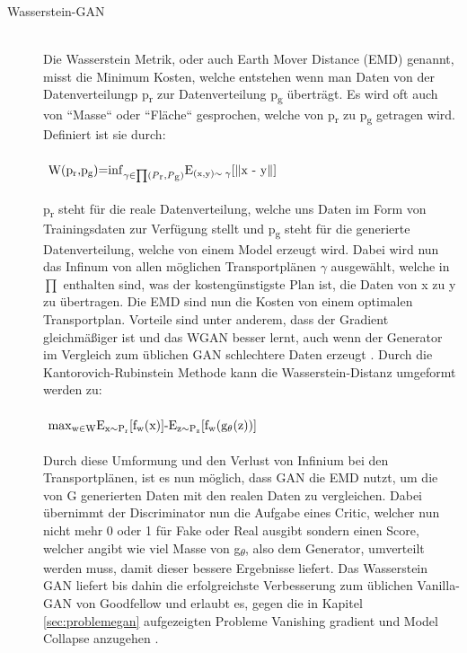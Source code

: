 \documentclass{llncs}
\begin{document}
\begin{description}
\item[Wasserstein-GAN]
~\\
Die Wasserstein Metrik, oder auch Earth Mover Distance (EMD) genannt, misst die Minimum Kosten, welche entstehen wenn man Daten von der Datenverteilungp p\textsubscript{r} zur Datenverteilung p\textsubscript{g} überträgt. Es wird oft auch von ``Masse`` oder ``Fläche`` gesprochen, welche von p\textsubscript{r} zu p\textsubscript{g} getragen wird. Definiert ist sie durch:
\\\\
\begin{math} 
$
W(p\textsubscript{r},p\textsubscript{g})=$\inf_{\gamma\in\prod(P\textsubscript{r},P\textsubscript{g})}$E\textsubscript{(x,y)$\sim\gamma$}[$\parallel$x - y$\parallel$]
$
\end{math}
\\\\
p\textsubscript{r} steht für die reale Datenverteilung, welche uns Daten im Form von Trainingsdaten zur Verfügung stellt und p\textsubscript{g} steht für die generierte Datenverteilung, welche von einem Model erzeugt wird. Dabei wird nun das Infinum von allen möglichen Transportplänen $\gamma$ ausgewählt, welche in $\prod$ enthalten sind, was der kostengünstigste Plan ist, die Daten von x zu y zu übertragen. Die EMD sind nun die Kosten von einem optimalen Transportplan. Vorteile sind unter anderem, dass der Gradient gleichmäßiger ist und das WGAN besser lernt, auch wenn der Generator  im Vergleich zum üblichen GAN schlechtere Daten erzeugt \cite{wasser}. Durch die Kantorovich-Rubinstein Methode kann die Wasserstein-Distanz umgeformt werden zu:
\\\\
\begin{math} 
$
$\max$\textsubscript{w$\in$W}E\textsubscript{x$\sim$P\textsubscript{r}}[f\textsubscript{w}(x)]-E\textsubscript{z$\sim$P\textsubscript{z}}[f\textsubscript{w}(g\textsubscript{$\theta$}(z))]
$
\end{math}
\\\\
Durch diese Umformung und den Verlust von Infinium bei den Transportplänen, ist es nun möglich, dass GAN die EMD nutzt, um die von G generierten Daten mit den realen Daten zu vergleichen. Dabei übernimmt der Discriminator nun die Aufgabe eines Critic, welcher nun nicht mehr 0 oder 1 für Fake oder Real ausgibt sondern einen Score, welcher angibt wie viel Masse von  g\textsubscript{$\theta$}, also dem Generator, umverteilt werden muss, damit dieser bessere Ergebnisse liefert. Das Wasserstein GAN liefert bis dahin die erfolgreichste Verbesserung zum üblichen Vanilla-GAN von Goodfellow und erlaubt es, gegen die in Kapitel \ref{sec:problemegan} aufgezeigten Probleme Vanishing gradient und Model Collapse anzugehen \cite{wasser}. 
\end{description}
\newpage
\end{document}
